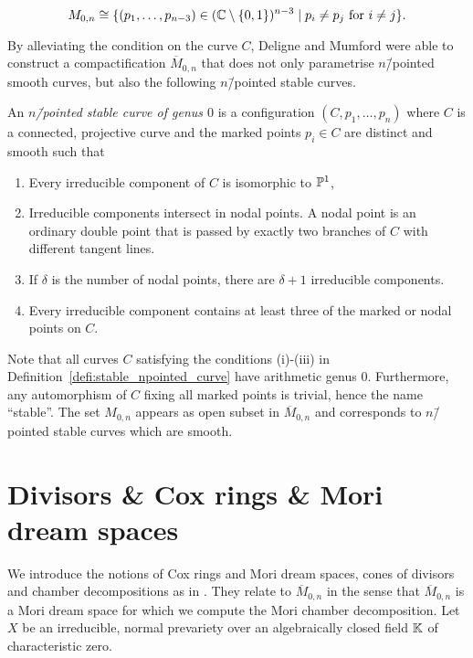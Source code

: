 $$M_{0,n} \cong \{(p_1,\dots,p_{n-3})\in (\mathbb{C} \setminus \{0,1\})^{n-3} \mid p_i\neq p_j\ \mathrm{for}\ i\neq j\}.$$

By alleviating the condition on the curve $C$, Deligne and Mumford were able to construct a compactification $\overline{M}_{0,n}$ that does not only parametrise $n$\=/pointed smooth curves, but also the following $n$\=/pointed stable curves. \cite{curves_of_a_given_genus}
%

\begin{defi}
	\label{defi:stable_npointed_curve}
	An \emph{$n$\=/pointed stable curve of genus $0$} is a configuration $(C,p_1,\dots,p_n)$ where $C$ is a connected, projective curve and the marked points $p_i\in C$ are distinct and smooth such that
	\begin{enumerate}[label={\upshape(\roman*)}]
		\item Every irreducible component of $C$ is isomorphic to $\mathbb{P}^1$,
		\item Irreducible components intersect in nodal points. A nodal point is an ordinary double point that is passed by exactly two branches of $C$ with different tangent lines.
		\item If $\delta$ is the number of nodal points, there are $\delta + 1 $ irreducible components.
		\item Every irreducible component contains at least three of the marked or nodal points on $C$.
	\end{enumerate}
\end{defi}

\begin{remark}
	Note that all curves $C$ satisfying the conditions (i)-(iii) in Definition~\ref{defi:stable_npointed_curve} have arithmetic genus $0$. Furthermore, any automorphism of $C$ fixing all marked points is trivial, hence the name ``stable''. The set $M_{0,n}$ appears as open subset in $\overline{M}_{0,n}$ and corresponds to $n$\=/pointed stable curves which are smooth.
\end{remark}

\section{Divisors \& Cox rings \& Mori dream spaces}

We introduce the notions of Cox rings and Mori dream spaces, cones of divisors and chamber decompositions as in \cite{cox_rings}. They relate to $\overline{M}_{0,n}$ in the sense that $\overline{M}_{0,n}$ is a Mori dream space for which we compute the Mori chamber decomposition. Let $X$ be an irreducible, normal prevariety over an algebraically closed field $\mathbb{K}$ of characteristic zero.

